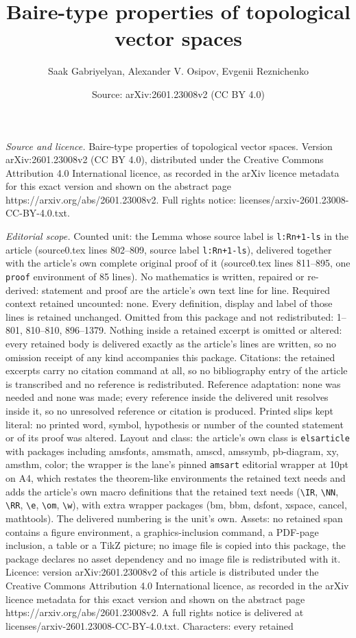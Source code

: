 \documentclass[10pt,a4paper]{amsart}
\title[Baire-type properties of topological vector spaces]{Baire-type properties of topological vector spaces}
\author{Saak Gabriyelyan, Alexander V. Osipov, Evgenii Reznichenko}
\date{Source: arXiv:2601.23008v2 (CC BY 4.0)}
\begin{document}
\maketitle

\noindent\emph{Source and licence.} Baire-type properties of topological vector spaces. Version arXiv:2601.23008v2 (CC BY 4.0), distributed under the Creative Commons Attribution 4.0 International licence, as recorded in the arXiv licence metadata for this exact version and shown on the abstract page https://arxiv.org/abs/2601.23008v2. Full rights notice: licenses/arxiv-2601.23008-CC-BY-4.0.txt.\par\smallskip

\noindent\textit{Editorial scope.} Counted unit: the Lemma whose source label is \texttt{l:Rn+1-ls} in the article (source0.tex lines 802--809, source label \texttt{l:Rn+1-ls}), delivered together with the article's own complete original proof of it (source0.tex lines 811--895, one \texttt{proof} environment of 85 lines). No mathematics is written, repaired or re-derived: statement and proof are the article's own text line for line. Required context retained uncounted: none. Every definition, display and label of those lines is retained unchanged. Omitted from this package and not redistributed: 1--801, 810--810, 896--1379. Nothing inside a retained excerpt is omitted or altered: every retained body is delivered exactly as the article's lines are written, so no omission receipt of any kind accompanies this package. Citations: the retained excerpts carry no citation command at all, so no bibliography entry of the article is transcribed and no reference is redistributed. Reference adaptation: none was needed and none was made; every reference inside the delivered unit resolves inside it, so no unresolved reference or citation is produced. Printed slips kept literal: no printed word, symbol, hypothesis or number of the counted statement or of its proof was altered. Layout and class: the article's own class is \texttt{elsarticle} with packages including amsfonts, amsmath, amscd, amssymb, pb-diagram, xy, amsthm, color; the wrapper is the lane's pinned \texttt{amsart} editorial wrapper at 10pt on A4, which restates the theorem-like environments the retained text needs and adds the article's own macro definitions that the retained text needs (\texttt{\textbackslash IR}, \texttt{\textbackslash NN}, \texttt{\textbackslash RR}, \texttt{\textbackslash e}, \texttt{\textbackslash om}, \texttt{\textbackslash w}), with extra wrapper packages (bm, bbm, dsfont, xspace, cancel, mathtools). The delivered numbering is the unit's own. Assets: no retained span contains a figure environment, a graphics-inclusion command, a PDF-page inclusion, a table or a TikZ picture; no image file is copied into this package, the package declares no asset dependency and no image file is redistributed with it. Licence: version arXiv:2601.23008v2 of this article is distributed under the Creative Commons Attribution 4.0 International licence, as recorded in the arXiv licence metadata for this exact version and shown on the abstract page https://arxiv.org/abs/2601.23008v2. A full rights notice is delivered at licenses/arxiv-2601.23008-CC-BY-4.0.txt. Characters: every retained 
\end{document}
